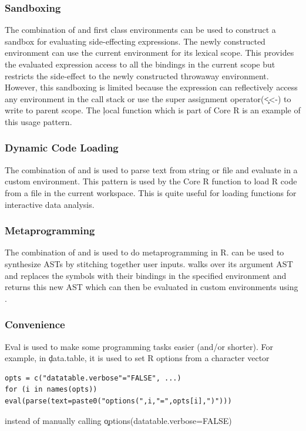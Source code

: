 \documentclass[conference]{IEEEtran}
\begin{document}
\subsubsection{Sandboxing} The combination of \eval and first class
environments can be used to construct a sandbox for evaluating
side-effecting expressions. The newly constructed environment can use the
current environment for its lexical scope. This provides the evaluated
expression access to all the bindings in the current scope but restricts the
side-effect to the newly constructed throwaway environment. However, this
sandboxing is limited because the expression can reflectively access any
environment in the call stack or use the super assignment operator(\c{<<-})
to write to parent scope. The \c{local} function which is part of Core R is
an example of this usage pattern.

\subsubsection{Dynamic Code Loading} The combination of \parse and \eval is
used to parse text from string or file and evaluate in a custom environment.
This pattern is used by the \source Core R function to load R code from a
file in the current workspace. This is quite useful for loading functions
for interactive data analysis.

\subsubsection{Metaprogramming} The combination of \eval and \substitute is
 used to do metaprogramming in R. \substitute can be used to synthesize ASTs
 by stitching together user inputs. \substitute walks over its argument AST
 and replaces the symbols with their bindings in the specified environment
 and returns this new AST which can then be evaluated in custom environments
 using \eval.

  \subsubsection{Convenience} Eval is used to make some programming tasks easier (and/or shorter). For example, in \c{data.table}, it is used to set R options from a character vector
  \begin{lstlisting}
opts = c("datatable.verbose"="FALSE", ...)
for (i in names(opts)) eval(parse(text=paste0("options(",i,"=",opts[i],")")))

  \end{lstlisting}
  instead of manually calling \c{options(datatable.verbose=FALSE)}
\end{document}
